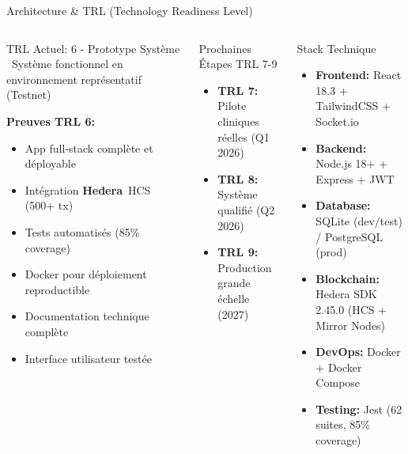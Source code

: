 \documentclass[aspectratio=169,11pt]{beamer}
\newcommand{\hedera}{\textbf{Hedera}\texttrademark}
\newcommand{\checkmark}{\textcolor{successGreen}{\faCheckCircle}}
\begin{document}
\begin{frame}{Architecture \& TRL (Technology Readiness Level)}

\begin{columns}[T]
\begin{block}{TRL Actuel: 6 - Prototype Système}
\checkmark~Système fonctionnel en environnement représentatif (Testnet)

\vspace{0.2cm}
\textbf{Preuves TRL 6:}
\small
\begin{itemize}
    \item App full-stack complète et déployable
    \item Intégration \hedera~HCS (500+ tx)
    \item Tests automatisés (85\% coverage)
    \item Docker pour déploiement reproductible
    \item Documentation technique complète
    \item Interface utilisateur testée
\end{itemize}
\end{block}

\vspace{0.2cm}

\begin{exampleblock}{Prochaines Étapes TRL 7-9}
\small
\begin{itemize}
    \item \textbf{TRL 7:} Pilote cliniques réelles (Q1 2026)
    \item \textbf{TRL 8:} Système qualifié (Q2 2026)
    \item \textbf{TRL 9:} Production grande échelle (2027)
\end{itemize}
\end{exampleblock}

\begin{block}{Stack Technique}
\tiny
\begin{itemize}
    \item \textbf{Frontend:} React 18.3 + TailwindCSS + Socket.io
    \item \textbf{Backend:} Node.js 18+ + Express + JWT
    \item \textbf{Database:} SQLite (dev/test) / PostgreSQL (prod)
    \item \textbf{Blockchain:} Hedera SDK 2.45.0 (HCS + Mirror Nodes)
    \item \textbf{DevOps:} Docker + Docker Compose
    \item \textbf{Testing:} Jest (62 suites, 85\% coverage)
\end{itemize}
\end{block}


\end{columns}
\end{frame}
\end{document}
